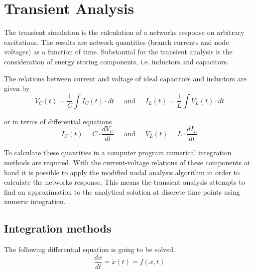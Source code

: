 %
%
%
%

\chapter{Transient Analysis}

The transient simulation is the calculation of a networks response on
arbitrary excitations.  The results are network quantities (branch
currents and node voltages) as a function of time.  Substantial for
the transient analysis is the consideration of energy storing
components, i.e. inductors and capacitors.

\addvspace{12pt}

The relations between current and voltage of ideal capacitors and
inductors are given by
\begin{equation}
V_C(t) = \dfrac{1}{C}\int I_C(t) \cdot dt
\;\;\;\; \textrm{ and } \;\;\;\;
I_L(t) = \dfrac{1}{L}\int V_L(t) \cdot dt
\end{equation}

or in terms of differential equations
\begin{equation}
I_C(t) = C\cdot \dfrac{d V_C}{d t}
\;\;\;\; \textrm{ and } \;\;\;\;
V_L(t) = L\cdot \dfrac{d I_L}{d t}
\end{equation}

To calculate these quantities in a computer program numerical
integration methods are required.  With the current-voltage relations
of these components at hand it is possible to apply the modified nodal
analysis algorithm in order to calculate the networks response.  This
means the transient analysis attempts to find an approximation to the
analytical solution at discrete time points using numeric integration.

\section{Integration methods}
\label{sec:IntegrationMethods}

The following differential equation is going to be solved.
\begin{equation}
\dfrac{d x}{d t} = \dot{x}(t) = f(x,t)
\label{eq:IntEquation}
\end{equation}

